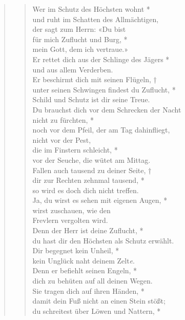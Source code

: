 \begin{quote}
 
\begin{verse}
 

Wer im Schutz des Höchsten wohnt *\\ 
und ruht im Schatten des Allmächtigen,\\
\vin der sagt zum Herrn:  «Du bist  \\ \vin für mich Zuflucht und Burg, *\\
\vin mein Gott, dem ich vertraue.»\\
Er rettet dich aus der Schlinge des Jägers *\\
und aus allem Verderben.\\
\vin Er beschirmt dich mit seinen Flügeln, †\\
\vin unter seinen Schwingen findest du Zuflucht, *\\
\vin Schild und Schutz ist dir seine Treue.\\
Du brauchst dich vor dem Schrecken der Nacht\\ nicht zu fürchten, *\\
noch vor dem Pfeil, der am Tag dahinfliegt,\\
\vin nicht vor der Pest, \\ \vin die im Finstern schleicht, *\\
\vin vor der Seuche, die wütet am Mittag.\\
Fallen auch tausend zu deiner Seite, †\\
dir zur Rechten zehnmal tausend, *\\
so wird es doch dich nicht treffen.\\
\vin Ja, du wirst es sehen mit eigenen Augen, *\\
\vin wirst zuschauen, wie den \\ \vin Frevlern vergolten wird.\\
Denn der Herr ist deine Zuflucht, *\\
du hast dir den Höchsten als Schutz erwählt.\\
\vin Dir begegnet kein Unheil, *\\
\vin kein Unglück naht deinem Zelt\textit{e}.\\
Denn er befiehlt seinen Engeln, *\\
 dich zu behüten auf all deinen Wegen.\\
\vin Sie tragen dich auf ihren Händen, *\\
\vin damit dein Fuß nicht an einen Stein stößt;\\
du schreitest über Löwen und Nattern, *\\

\end{verse}
\end{quote}

